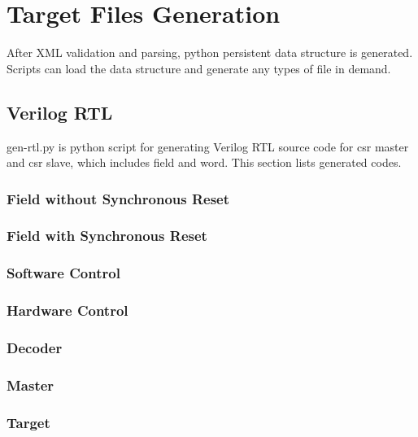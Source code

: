 \documentclass[10pt,oneside]{book}
\begin{document}
\chapter{Target Files Generation}
After XML validation and parsing, python persistent data structure
is generated. Scripts can load the data structure and generate any 
types of file in demand. 

\section{Verilog RTL}
\textsf{gen-rtl.py} is python script for generating Verilog 
RTL source code for \gls{csr master} and \gls{csr slave}, 
which includes \gls{field} and \gls{word}. This section lists
generated codes. 
\subsection{Field without Synchronous Reset}


\subsection{Field with Synchronous Reset}


\subsection{Software Control}


\subsection{Hardware Control}


\subsection{Decoder}
\subsection{Master}
\subsection{Target}
\end{document}
